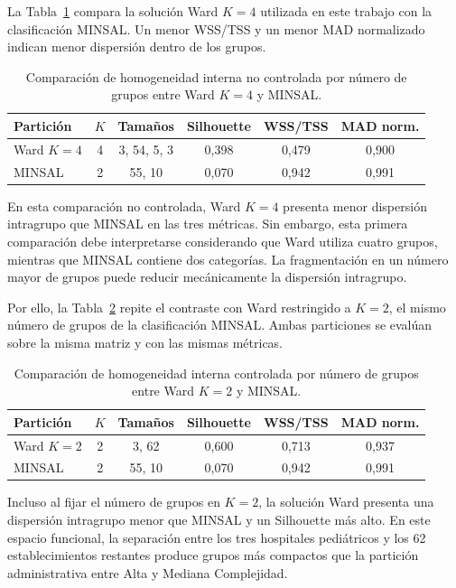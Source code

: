 La Tabla~\ref{tab:homogeneidad-no-controlada} compara la solución Ward $K=4$
utilizada en este trabajo con la clasificación MINSAL. Un menor WSS/TSS y un
menor MAD normalizado indican menor dispersión dentro de los grupos.

\begin{table}[htbp]
\centering
\caption{Comparación de homogeneidad interna no controlada por número de grupos entre Ward $K=4$ y MINSAL.}
\label{tab:homogeneidad-no-controlada}
\begin{tabular}{l c c c c c}
\toprule
\textbf{Partición} & \textbf{$K$} & \textbf{Tamaños} &
\textbf{Silhouette} & \textbf{WSS/TSS} &
\textbf{MAD norm.} \\
\midrule
Ward $K=4$ & 4 & 3, 54, 5, 3 & 0,398 & 0,479 & 0,900 \\
MINSAL & 2 & 55, 10 & 0,070 & 0,942 & 0,991 \\
\bottomrule
\end{tabular}
\end{table}

En esta comparación no controlada, Ward $K=4$ presenta menor dispersión
intragrupo que MINSAL en las tres métricas. Sin embargo, esta primera
comparación debe interpretarse considerando que Ward utiliza cuatro grupos,
mientras que MINSAL contiene dos categorías. La fragmentación en un número
mayor de grupos puede reducir mecánicamente la dispersión intragrupo.

Por ello, la Tabla~\ref{tab:homogeneidad-controlada} repite el contraste con
Ward restringido a $K=2$, el mismo número de grupos de la clasificación MINSAL.
Ambas particiones se evalúan sobre la misma matriz y con las mismas métricas.

\begin{table}[htbp]
\centering
\caption{Comparación de homogeneidad interna controlada por número de grupos entre Ward $K=2$ y MINSAL.}
\label{tab:homogeneidad-controlada}
\begin{tabular}{l c c c c c}
\toprule
\textbf{Partición} & \textbf{$K$} & \textbf{Tamaños} &
\textbf{Silhouette} & \textbf{WSS/TSS} &
\textbf{MAD norm.} \\
\midrule
Ward $K=2$ & 2 & 3, 62 & 0,600 & 0,713 & 0,937 \\
MINSAL & 2 & 55, 10 & 0,070 & 0,942 & 0,991 \\
\bottomrule
\end{tabular}
\end{table}

Incluso al fijar el número de grupos en $K=2$, la solución Ward presenta una
dispersión intragrupo menor que MINSAL y un Silhouette más alto. En este espacio
funcional, la separación entre los tres hospitales pediátricos y los 62
establecimientos restantes produce grupos más compactos que la partición
administrativa entre Alta y Mediana Complejidad.

